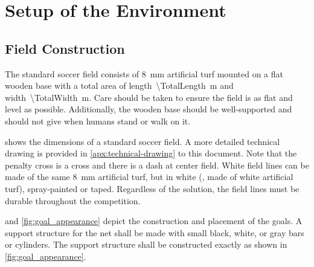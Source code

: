 \section{Setup of the Environment}
\label{sec:setup_environment}

\subsection{Field Construction}
\label{sec:field_dim}

The standard soccer field consists of \qty{8}{\milli\metre} artificial turf mounted on a flat wooden base with a total area of length~\qty{\TotalLength}{\metre} and width~\qty{\TotalWidth}{\metre}. Care should be taken to ensure the field is as flat and level as possible. Additionally, the wooden base should be well-supported and should not give when humans stand or walk on it.

 shows the dimensions of a standard soccer field.
A more detailed technical drawing is provided in \cref{apx:technical-drawing} to this document.
Note that the penalty cross is a cross and there is a dash at center field. White field lines can be made of the same \qty{8}{\milli\metre} artificial turf, but in white (\ie, made of white artificial turf), spray-painted or taped. Regardless of the solution, the field lines must be durable throughout the competition.

 and \cref{fig:goal_appearance} depict the construction and placement of the goals. A support structure for the net shall be made with small black, white, or gray bars or cylinders.  The support structure shall be constructed exactly as shown in \cref{fig:goal_appearance}.

